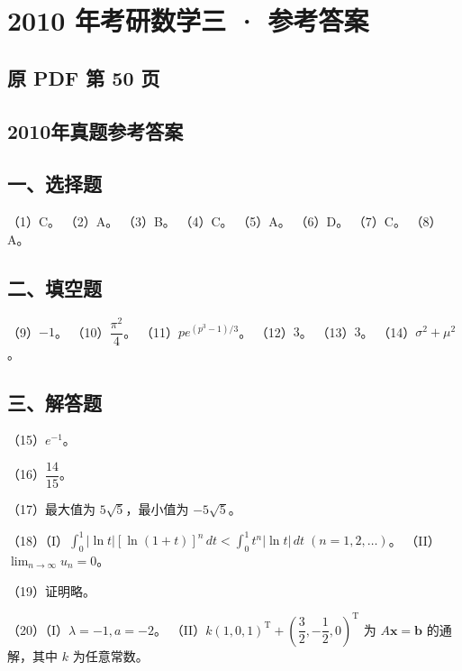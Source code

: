 \documentclass[UTF8,12pt]{ctexart}
\begin{document}
\section*{2010 年考研数学三 · 参考答案}
\subsection*{原 PDF 第 50 页}

\subsection*{2010年真题参考答案}

\subsection*{一、选择题}

（1）C。 （2）A。 （3）B。 （4）C。 （5）A。 （6）D。 （7）C。 （8）A。


\subsection*{二、填空题}

（9）\(\displaystyle -1\)。 （10）\(\displaystyle \dfrac{\displaystyle \pi^2}{\displaystyle 4}\)。 （11）\(\displaystyle pe^{(p^3-1)/3}\)。 （12）\(\displaystyle 3\)。 （13）\(\displaystyle 3\)。 （14）\(\displaystyle \sigma^2+\mu^2\)。


\subsection*{三、解答题}

（15）\(\displaystyle e^{-1}\)。


（16）\(\displaystyle \dfrac{\displaystyle 14}{\displaystyle 15}\)。


（17）最大值为 \(\displaystyle 5\sqrt5\)，最小值为 \(\displaystyle -5\sqrt5\)。


（18）（I）\(\displaystyle \int_0^1|\ln t|[\ln(1+t)]^n\,dt<\displaystyle \int_0^1t^n|\ln t|\,dt\; (n=1,\allowbreak 2,\allowbreak \ldots)\)。
（II）\(\displaystyle \lim_{n\to\infty}u_n=0\)。


（19）证明略。


（20）（I）\(\displaystyle \lambda=-1,\allowbreak a=-2\)。
（II）\(\displaystyle k(1,\allowbreak 0,\allowbreak 1)^{\mathrm T}+\left(\dfrac{\displaystyle 3}{\displaystyle 2},\allowbreak -\dfrac{\displaystyle 1}{\displaystyle 2},\allowbreak 0\right)^{\mathrm T}\) 为 \(\displaystyle A\boldsymbol x=\boldsymbol b\) 的通解，其中 \(\displaystyle k\) 为任意常数。
\end{document}
